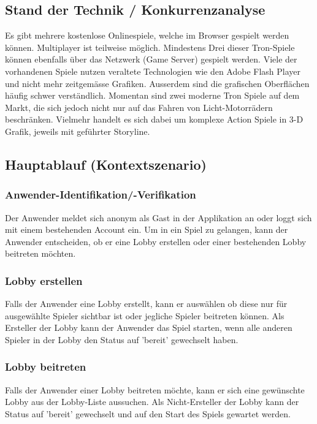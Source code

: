 \documentclass[11pt,ngerman]{article}
\begin{document}
    \subsection{Stand der Technik / Konkurrenzanalyse}
    Es gibt mehrere kostenlose Onlinespiele, welche im Browser gespielt werden können. \Gls{Multiplayer} ist teilweise möglich. Mindestens Drei dieser Tron-Spiele können ebenfalls über das Netzwerk (\Gls{Game Server}) gespielt werden. \cite{TronGameBasisKostenlosOnline}\cite{sphinxCyclewarsIoOnline}\cite{TronLightCyclesEu}\cite{PlayersOnlineXtremeTron}
    Viele der vorhandenen Spiele nutzen veraltete Technologien wie den \Gls{Adobe Flash Player} \cite{SayingGoodbyeFlash2017}\cite{FlashFutureInteractive2017} und nicht mehr zeitgemässe Grafiken. Ausserdem sind die grafischen Oberflächen häufig schwer verständlich.
    Momentan sind zwei moderne Tron Spiele auf dem Markt, die sich jedoch nicht nur auf das Fahren von Licht-Motorrädern beschränken. Vielmehr handelt es sich dabei um komplexe Action Spiele in 3-D Grafik, jeweils mit geführter Storyline.\cite{TronEvolution2020}\cite{TRONRUNr}

    \subsection{Hauptablauf (Kontextszenario)}

    \subsubsection{Anwender-Identifikation/-Verifikation}
	Der Anwender meldet sich anonym als Gast in der Applikation an oder loggt sich mit einem bestehenden Account ein. Um in ein Spiel zu gelangen, kann der Anwender entscheiden, ob er eine Lobby erstellen oder einer bestehenden Lobby beitreten möchten.

	\subsubsection{\Gls{Lobby} erstellen}
	Falls der Anwender eine Lobby erstellt, kann er auswählen ob diese nur für ausgewählte Spieler sichtbar ist oder jegliche Spieler beitreten können. Als Ersteller der Lobby kann der Anwender das Spiel starten, wenn alle anderen Spieler in der Lobby den Status auf 'bereit' gewechselt haben.

	\subsubsection{\Gls{Lobby} beitreten}
	Falls der Anwender einer Lobby beitreten möchte, kann er sich eine gewünschte Lobby aus der Lobby-Liste aussuchen. Als Nicht-Ersteller der Lobby kann der Status auf 'bereit' gewechselt und auf den Start des Spiels gewartet werden.
\end{document}
